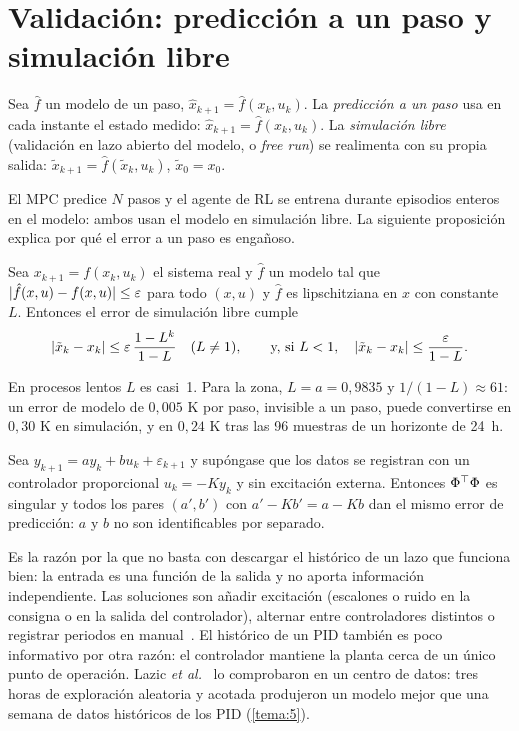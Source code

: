 \addtocounter{definicion}{1}%

\section{Validación: predicción a un paso y simulación libre}

\begin{definicion}\label{def:validacion}
Sea $\hat f$ un modelo de un paso, $\hat x_{k+1}=\hat f(x_k,u_k)$. La \emph{predicción a un paso} usa en cada instante el estado medido: $\hat x_{k+1}=\hat f(x_k,u_k)$. La \emph{simulación libre} (validación en lazo abierto del modelo, o \emph{free run}) se realimenta con su propia salida: $\tilde x_{k+1}=\hat f(\tilde x_k,u_k)$, $\tilde x_0=x_0$.
\end{definicion}

El MPC predice $N$ pasos y el agente de RL se entrena durante episodios enteros en el modelo: ambos usan el modelo en simulación libre. La siguiente proposición explica por qué el error a un paso es engañoso.

\begin{proposicion}\label{prop:acumula}
Sea $x_{k+1}=f(x_k,u_k)$ el sistema real y $\hat f$ un modelo tal que $\lvert\hat f(x,u)-f(x,u)\rvert\le\varepsilon$ para todo $(x,u)$ y $\hat f$ es lipschitziana en $x$ con constante $L$. Entonces el error de simulación libre cumple
\[
\lvert\tilde x_k-x_k\rvert\le\varepsilon\,\frac{1-L^{k}}{1-L}\quad(L\ne1),\qquad\text{y, si }L<1,\quad \lvert\tilde x_k-x_k\rvert\le\frac{\varepsilon}{1-L}.
\]
\end{proposicion}

En procesos lentos $L$ es casi~1. Para la zona, $L=a=0{,}9835$ y $1/(1-L)\approx61$: un error de modelo de $0{,}005$ K por paso, invisible a un paso, puede convertirse en $0{,}30$ K en simulación, y en $0{,}24$ K tras las 96 muestras de un horizonte de 24~h.

\begin{proposicion}\label{prop:lazo}
Sea $y_{k+1}=ay_k+bu_k+\varepsilon_{k+1}$ y supóngase que los datos se registran con un controlador proporcional $u_k=-Ky_k$ y sin excitación externa. Entonces $\Phi^{\top}\Phi$ es singular y todos los pares $(a',b')$ con $a'-Kb'=a-Kb$ dan el mismo error de predicción: $a$ y $b$ no son identificables por separado.
\end{proposicion}

Es la razón por la que no basta con descargar el histórico de un lazo que funciona bien: la entrada es una función de la salida y no aporta información independiente. Las soluciones son añadir excitación (escalones o ruido en la consigna o en la salida del controlador), alternar entre controladores distintos o registrar periodos en manual~\cite{ljung}. El histórico de un PID también es poco informativo por otra razón: el controlador mantiene la planta cerca de un único punto de operación. Lazic \emph{et al.}~\cite{lazic} lo comprobaron en un centro de datos: tres horas de exploración aleatoria y acotada produjeron un modelo mejor que una semana de datos históricos de los PID (\cref{tema:5}).

